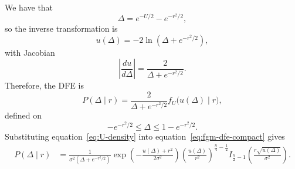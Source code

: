 We have that
\begin{equation}
    \Delta = e^{-U/2}-e^{-r^2/2},
\end{equation}
so the inverse transformation is
\begin{equation}
    u(\Delta)=-2\ln\!\left(\Delta+e^{-r^2/2}\right),
\end{equation}
with Jacobian
\begin{equation}
    \left|\frac{du}{d\Delta}\right|
    =
    \frac{2}{\Delta+e^{-r^2/2}}.
\end{equation}
Therefore, the DFE is
\begin{equation}
    P(\Delta\mid r)
    =
    \frac{2}{\Delta+e^{-r^2/2}}
    f_U\!\bigl(u(\Delta)\mid r\bigr),
    \label{eq:fgm-dfe-compact}
\end{equation}
defined on
\begin{equation}
    -e^{-r^2/2}\le \Delta \le 1-e^{-r^2/2}.
\end{equation}
Substituting equation~\eqref{eq:U-density} into equation~\eqref{eq:fgm-dfe-compact} gives
\begin{equation}
\begin{aligned}
    P(\Delta\mid r)
    &=
    \frac{1}{\sigma^2\left(\Delta+e^{-r^2/2}\right)}
    \exp\!\left(-\frac{u(\Delta)+r^2}{2\sigma^2}\right)
    \left(\frac{u(\Delta)}{r^2}\right)^{\frac{n}{4}-\frac12}
    I_{\frac n2-1}\!\left(\frac{r\sqrt{u(\Delta)}}{\sigma^2}\right).
\end{aligned}
\label{eq:fgm-dfe-explicit}
\end{equation}